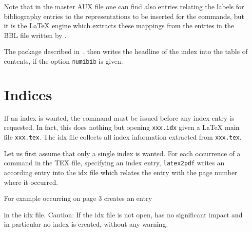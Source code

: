 Note that in the master AUX file one can find also entries  
relating the labels for bibliography entries to the representations 
to be inserted for the  commands, 
but it is the \LaTeX{} engine which extracts these mappings 
from the  entries in the BBL file written by . 

The package  described in~\cite{TocBibIndP}, 
then writes the headline of the index into the table of contents, 
if the option \texttt{numibib} is given.



\section{Indices}\label{sec:indices}

If an index is wanted, the command  must be issued
before any index entry is requested. 
In fact, this does nothing but opening \texttt{xxx.idx} 
given a \LaTeX{} main file \texttt{xxx.tex}. 
The \gls{idx} file collects all index information extracted from \texttt{xxx.tex}. 




Let us first assume that only a single index is wanted. 
For each occurrence 
of a command  in the TEX file, 
specifying an index entry,
\texttt{latex2pdf} writes an according entry  
into the \gls{idx} file 
which relates the entry with the page number where it occurred. 

For example  occurring on page 3 creates an entry 
%
\begin{taglstlisting}[language=TeX]
\end{taglstlisting}
%
in the \gls{idx} file. 
Caution: If the \gls{idx} file is not open, 
 has no significant impact and in particular no index is created, 
without any warning. 

